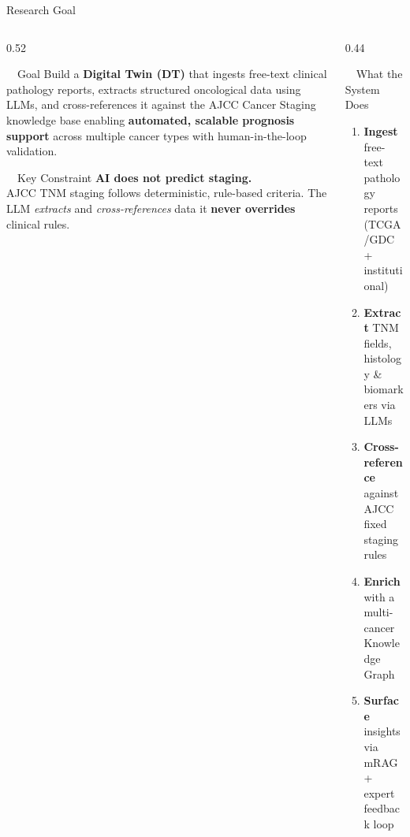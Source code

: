 \documentclass[aspectratio=169, 10pt]{beamer}
\begin{document}
\begin{frame}{Research Goal}

\begin{columns}[T]
\begin{column}{0.52\textwidth}

\begin{block}{\faBullseye\ \ Goal}
\normalsize
Build a \textbf{Digital Twin (DT)} that ingests free-text clinical pathology reports, extracts structured oncological data using LLMs, and cross-references it against the AJCC Cancer Staging knowledge base  enabling \textbf{automated, scalable prognosis support} across multiple cancer types with human-in-the-loop validation.
\end{block}

\vspace{8pt}
\begin{block}{\faExclamationCircle\ \ Key Constraint}
\small
\textbf{AI does not predict staging.}\\[4pt]
AJCC TNM staging follows deterministic, rule-based criteria. The LLM \textit{extracts} and \textit{cross-references} data  it \textbf{never overrides} clinical rules. 
\end{block}

\end{column}

\begin{column}{0.44\textwidth}

\begin{exampleblock}{\faLayerGroup\ \ What the System Does}
\small
\begin{enumerate}\setlength{\itemsep}{6pt}
    \item \textbf{Ingest} free-text pathology reports\\(TCGA/GDC + institutional)
    \item \textbf{Extract} TNM fields, histology \& biomarkers via LLMs
    \item \textbf{Cross-reference} against AJCC fixed staging rules
    \item \textbf{Enrich} with a multi-cancer Knowledge Graph
    \item \textbf{Surface} insights via mRAG + expert feedback loop
\end{enumerate}
\end{exampleblock}

\end{column}
\end{columns}

\end{frame}
\end{document}
